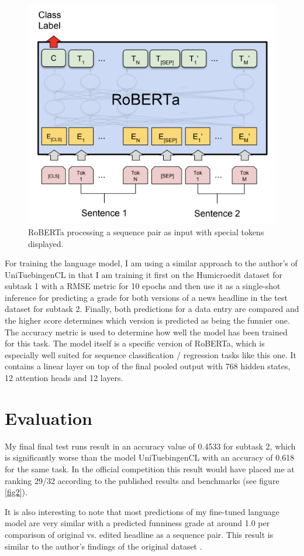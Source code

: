 \documentclass[11pt,a4paper,onecolumn,oneside,notitlepage]{article}
\begin{document}
    \begin{figure}
        \begin{center}
            \includegraphics[width=0.4\linewidth]{images/roberta_sequence.png}
        \end{center}
        \caption{RoBERTa processing a sequence pair as input with special tokens displayed.}\label{fig1}
    \end{figure}

    For training the language model, I am using a similar approach to the author's of UniTuebingenCL \citep{ammer-gruner-2020-unituebingencl} in that I am training it first on the Humicroedit dataset for subtask 1 with a RMSE metric for 10 epochs and then use it as a single-shot inference for predicting a grade for both versions of a news headline in the test dataset for subtask 2. Finally, both predictions for a data entry are compared and the higher score determines which version is predicted as being the funnier one. The accuracy metric is used to determine how well the model has been trained for this task. The model itself is a specific version of RoBERTa, which is especially well suited for sequence classification / regression tasks like this one. It contains a linear layer on top of the final pooled output with 768 hidden states, 12 attention heads and 12 layers.


    \section{Evaluation}
    My final final test runs result in an accuracy value of 0.4533 for subtask 2, which is significantly worse than the model UniTuebingenCL \citep{ammer-gruner-2020-unituebingencl} with an accuracy of 0.618 for the same task. In the official competition this result would have placed me at ranking 29/32 according to the published results and benchmarks (see figure \ref{fig2}).

    It is also interesting to note that most predictions of my fine-tuned language model are very similar with a predicted funniness grade at around 1.0 per comparison of original vs. edited headline as a sequence pair. This result is similar to the author's findings of the original dataset \citep{hossain-etal-2019-president}.
\end{document}
